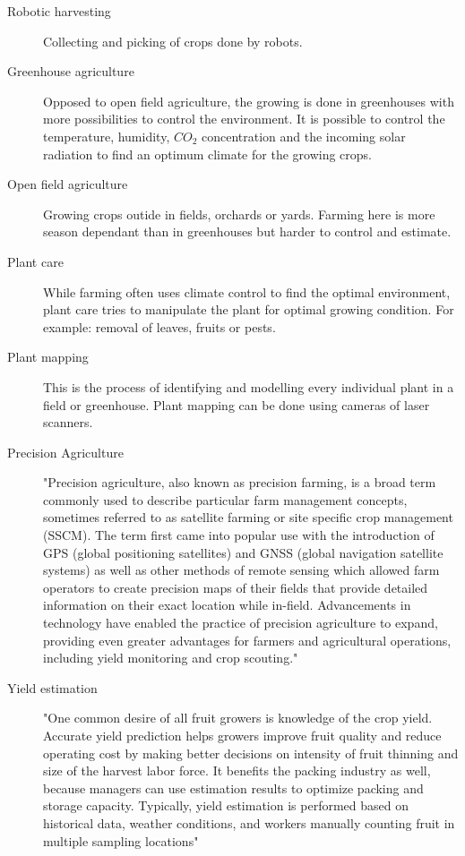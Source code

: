\documentclass{article}
\begin{document}
\begin{description}
    \item[Robotic harvesting] Collecting and picking of crops done by robots.
    \item[Greenhouse agriculture] Opposed to open field agriculture, the growing is done in greenhouses with more possibilities to control the environment. It is possible to control the temperature, humidity, $CO_2$ concentration and the incoming solar radiation to find an optimum climate for the growing crops.
    \item[Open field agriculture] Growing crops outide in fields, orchards or yards. Farming here is more season dependant than in greenhouses but harder to control and estimate.
    \item[Plant care] While farming often uses climate control to find the optimal environment, plant care tries to manipulate the plant for optimal growing condition. For example: removal of leaves, fruits or pests.
    \item[Plant mapping] This is the process of identifying and modelling every individual plant in a field or greenhouse. Plant mapping can be done using cameras of laser scanners. 
    \item[Precision Agriculture] "Precision agriculture, also known as precision farming, is a broad term commonly used to describe particular farm management concepts, sometimes referred to as satellite farming or site specific crop management (SSCM). The term first came into popular use with the introduction of GPS (global positioning satellites) and GNSS (global navigation satellite systems) as well as other methods of remote sensing which allowed farm operators to create precision maps of their fields that provide detailed information on their exact location while in-field. Advancements in technology have enabled the practice of precision agriculture to expand, providing even greater advantages for farmers and agricultural operations, including yield monitoring and crop scouting." \cite{Farms2020}
    \item[Yield estimation] "One common desire of all fruit growers is knowledge of the crop yield. Accurate yield prediction helps growers improve fruit quality and reduce operating cost by making better decisions on intensity of fruit thinning and size of the harvest labor force. It benefits the packing industry as well, because managers can use estimation results to optimize packing and storage capacity. Typically, yield estimation is performed based on historical data, weather conditions, and workers manually counting fruit in multiple sampling locations" \cite{Siciliano2016}
\end{description}

\newpage


\end{document}
